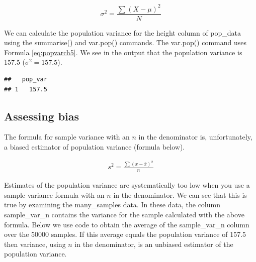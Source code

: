\documentclass[
]{krantz}
\makeatletter
\newenvironment{Shaded}{\begin{snugshade}}{\end{snugshade}}
\newcommand{\DataTypeTok}[1]{\textcolor[rgb]{0.27,0.27,0.27}{#1}}
\newcommand{\KeywordTok}[1]{\textcolor[rgb]{0.27,0.27,0.27}{\textbf{#1}}}
\newcommand{\NormalTok}[1]{#1}
\newcommand{\OperatorTok}[1]{\textcolor[rgb]{0.43,0.43,0.43}{\textbf{#1}}}
\newcommand{\StringTok}[1]{\textcolor[rgb]{0.5,0.5,0.5}{#1}}
\newenvironment{kframe}{%
\medskip{}
\setlength{\fboxsep}{.8em}
 \def\at@end@of@kframe{}%
 \ifinner\ifhmode%
  \def\at@end@of@kframe{\end{minipage}}%
  \begin{minipage}{\columnwidth}%
 \fi\fi%
 \def\FrameCommand##1{\hskip\@totalleftmargin \hskip-\fboxsep
 \colorbox{shadecolor}{##1}\hskip-\fboxsep
     \hskip-\linewidth \hskip-\@totalleftmargin \hskip\columnwidth}%
 \MakeFramed {\advance\hsize-\width
   \@totalleftmargin\z@ \linewidth\hsize
   \@setminipage}}%
 {\par\unskip\endMakeFramed%
 \at@end@of@kframe}
\renewenvironment{Shaded}{\begin{kframe}}{\end{kframe}}
\makeatother
\begin{document}
\begin{equation} 
\sigma^2 = \frac{\sum{(X - \mu)^2}}{N}
      \label{eq:popvarch5}
\end{equation}

We can calculate the population variance for the height column of pop\_data using the summarise() and var.pop() commands. The var.pop() command uses Formula \eqref{eq:popvarch5}. We see in the output that the population variance is 157.5 (\(\sigma^2 = 157.5\)).

\begin{Shaded}
\end{Shaded}

\begin{verbatim}
##   pop_var
## 1   157.5
\end{verbatim}

\hypertarget{assessing-bias-1}{%
\subsection{Assessing bias}\label{assessing-bias-1}}

The formula for sample variance with an \(n\) in the denominator is, unfortunately, a biased estimator of population variance (formula below).

\[
\begin{aligned} 
s^2 = \frac{\sum{(x - \bar{x})^2}}{n}
\end{aligned} 
\]

Estimates of the population variance are systematically too low when you use a sample variance formula with an \(n\) in the denominator. We can see that this is true by examining the many\_samples data. In these data, the column sample\_var\_n contains the variance for the sample calculated with the above formula. Below we use code to obtain the average of the sample\_var\_n column over the 50000 samples. If this average equals the population variance of 157.5 then variance, using \(n\) in the denominator, is an unbiased estimator of the population variance.

\begin{Shaded}
\end{Shaded}
\end{document}
